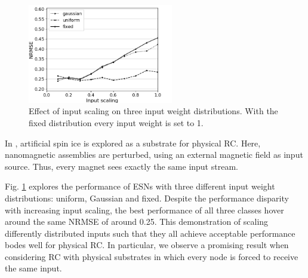 
\begin{figure}[H]
  \centering
  \includegraphics[width=2.5in]{img/input_scaling_distrib.png}
  \caption{
    Effect of input scaling on three input weight distributions. With the fixed
distribution every input weight is set to 1.
  }
  \label{input_scaling_distrib}
\end{figure}

In \cite{jensen_computation_2018}, artificial spin ice is explored as a
substrate for physical RC. Here, nanomagnetic assemblies are perturbed, using an
external magnetic field as input source. Thus, every magnet sees exactly the
same input stream.

Fig. \ref{input_scaling_distrib} explores the performance of ESNs with three
different input weight distributions: uniform, Gaussian and fixed. Despite the
performance disparity with increasing input scaling, the best performance of all
three classes hover around the same NRMSE of around 0.25. This demonstration of
scaling differently distributed inputs such that they all achieve acceptable
performance bodes well for physical RC. In particular, we observe a promising
result when considering RC with physical substrates in which every node is
forced to receive the same input.

